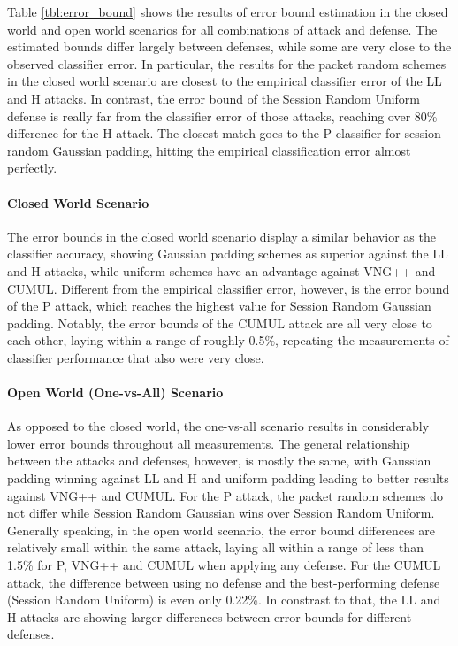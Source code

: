 \documentclass[
	ruledheaders=chapter,
	class=report,
	thesis={type=master, department=inf},
	accentcolor=1c,
	custommargins=true,
	marginpar=false,
	parskip=half-,
	fontsize=11pt,
]{tudapub}
\begin{document}
	Table \ref{tbl:error_bound} shows the results of error bound estimation in the closed world and open world scenarios for all combinations of attack and defense. The estimated bounds differ largely between defenses, while some are very close to the observed classifier error. In particular, the results for the packet random schemes in the closed world scenario are closest to the empirical classifier error of the LL and H attacks. In contrast, the error bound of the Session Random Uniform defense is really far from the classifier error of those attacks, reaching over 80\% difference for the H attack. The closest match goes to the P classifier for session random Gaussian padding, hitting the empirical classification error almost perfectly.
	
	\paragraph{Closed World Scenario} The error bounds in the closed world scenario display a similar behavior as the classifier accuracy, showing Gaussian padding schemes as superior against the LL and H attacks, while uniform schemes have an advantage against VNG++ and CUMUL. Different from the empirical classifier error, however, is the error bound of the P attack, which reaches the highest value for Session Random Gaussian padding. Notably, the error bounds of the CUMUL attack are all very close to each other, laying within a range of roughly 0.5\%, repeating the measurements of classifier performance that also were very close.
	
	\paragraph{Open World (One-vs-All) Scenario} As opposed to the closed world, the one-vs-all scenario results in considerably lower error bounds throughout all measurements. The general relationship between the attacks and defenses, however, is mostly the same, with Gaussian padding winning against LL and H and uniform padding leading to better results against VNG++ and CUMUL. For the P attack, the packet random schemes do not differ while Session Random Gaussian wins over Session Random Uniform. Generally speaking, in the open world scenario, the error bound differences are relatively small within the same attack, laying all within a range of less than 1.5\% for P, VNG++ and CUMUL when applying any defense. For the CUMUL attack, the difference between using no defense and the best-performing defense (Session Random Uniform) is even only 0.22\%. In constrast to that, the LL and H attacks are showing larger differences between error bounds for different defenses.
\end{document}

